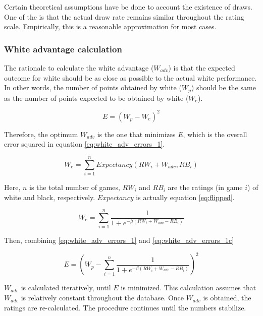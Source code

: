 \documentclass[12pt]{article}
\begin{document}
Certain theoretical assumptions have be done to account the existence of draws. 
One of the is that the actual draw rate remains similar throughout the rating scale.
Empirically, this is a reasonable approximation for most cases.

\subsubsection*{White advantage calculation}

The rationale to calculate the white advantage ($W_{adv}$) is that the expected outcome for white should be as close as possible to the actual white performance.
In other words, the number of points obtained by white ($W_{p}$) should be the same as the number of points expected to be obtained by white ($W_{e}$).

	\begin{equation} \label{eq:white_adv_errors_1}
	E = (W_{p} - W_{e})^2
	\end{equation}

Therefore, the optimum $W_{adv}$ is the one that minimizes $E$, which is the overall error squared in equation \ref{eq:white_adv_errors_1}.

	\begin{equation} \label{eq:white_adv_errors_1b}
	W_{e} = \sum\limits_{i=1}^n Expectancy(RW_{i} + W_{adv}, RB_{i})
	\end{equation}

Here, $n$ is the total number of games, $RW_{i}$ and $RB_{i}$ are the ratings (in game $i$) of white and black, respectively.
$Expectancy$ is actually equation \ref{eq:flipped}.

	\begin{equation} \label{eq:white_adv_errors_1c}
	W_{e} = \sum\limits_{i=1}^n \frac{1}{1 + e^{-\beta(RW_{i} + W_{adv}-RB_{i})}}
	\end{equation}

Then, combining \ref{eq:white_adv_errors_1} and \ref{eq:white_adv_errors_1c}

	\begin{equation} \label{eq:white_adv_errors_1d}
	E = \left(W_{p} - \sum\limits_{i=1}^n \frac{1}{1 + e^{-\beta(RW_{i} + W_{adv}-RB_{i})}}\right)^2
	\end{equation}

$W_{adv}$ is calculated iteratively, until $E$ is minimized.
This calculation assumes that $W_{adv}$ is relatively constant throughout the database.
Once $W_{adv}$ is obtained, the ratings are re-calculated.
The procedure continues until the numbers stabilize.
\end{document}
